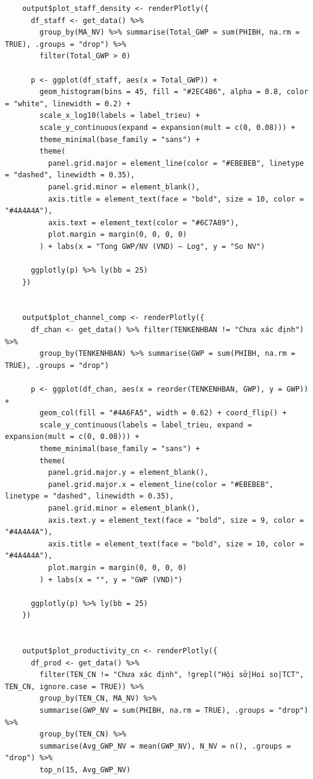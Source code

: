 \documentclass[12pt, a4paper]{article}
\begin{document}
\begin{lstlisting}
    output$plot_staff_density <- renderPlotly({
      df_staff <- get_data() %>%
        group_by(MA_NV) %>% summarise(Total_GWP = sum(PHIBH, na.rm = TRUE), .groups = "drop") %>%
        filter(Total_GWP > 0)

      p <- ggplot(df_staff, aes(x = Total_GWP)) +
        geom_histogram(bins = 45, fill = "#2EC4B6", alpha = 0.8, color = "white", linewidth = 0.2) +
        scale_x_log10(labels = label_trieu) +
        scale_y_continuous(expand = expansion(mult = c(0, 0.08))) +
        theme_minimal(base_family = "sans") +
        theme(
          panel.grid.major = element_line(color = "#EBEBEB", linetype = "dashed", linewidth = 0.35),
          panel.grid.minor = element_blank(),
          axis.title = element_text(face = "bold", size = 10, color = "#4A4A4A"),
          axis.text = element_text(color = "#6C7A89"),
          plot.margin = margin(0, 0, 0, 0)
        ) + labs(x = "Tong GWP/NV (VND) — Log", y = "So NV")

      ggplotly(p) %>% ly(bb = 25)
    })


    output$plot_channel_comp <- renderPlotly({
      df_chan <- get_data() %>% filter(TENKENHBAN != "Chưa xác định") %>%
        group_by(TENKENHBAN) %>% summarise(GWP = sum(PHIBH, na.rm = TRUE), .groups = "drop")

      p <- ggplot(df_chan, aes(x = reorder(TENKENHBAN, GWP), y = GWP)) +
        geom_col(fill = "#4A6FA5", width = 0.62) + coord_flip() +
        scale_y_continuous(labels = label_trieu, expand = expansion(mult = c(0, 0.08))) +
        theme_minimal(base_family = "sans") +
        theme(
          panel.grid.major.y = element_blank(),
          panel.grid.major.x = element_line(color = "#EBEBEB", linetype = "dashed", linewidth = 0.35),
          panel.grid.minor = element_blank(),
          axis.text.y = element_text(face = "bold", size = 9, color = "#4A4A4A"),
          axis.title = element_text(face = "bold", size = 10, color = "#4A4A4A"),
          plot.margin = margin(0, 0, 0, 0)
        ) + labs(x = "", y = "GWP (VND)")

      ggplotly(p) %>% ly(bb = 25)
    })


    output$plot_productivity_cn <- renderPlotly({
      df_prod <- get_data() %>%
        filter(TEN_CN != "Chưa xác định", !grepl("Hội sở|Hoi so|TCT", TEN_CN, ignore.case = TRUE)) %>%
        group_by(TEN_CN, MA_NV) %>%
        summarise(GWP_NV = sum(PHIBH, na.rm = TRUE), .groups = "drop") %>%
        group_by(TEN_CN) %>%
        summarise(Avg_GWP_NV = mean(GWP_NV), N_NV = n(), .groups = "drop") %>%
        top_n(15, Avg_GWP_NV)


\end{lstlisting}
\end{document}

